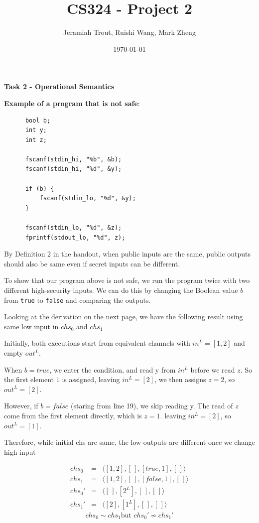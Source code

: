 \documentclass[11pt]{article}
\title{CS324 - Project 2}
\author{Jeramiah Trout, Ruishi Wang, Mark Zheng}
\date{\today}
\begin{document}
\maketitle
    
\noindent \textbf{Task 2 - Operational Semantics}

\textbf{Example of a program that is not safe}:
\begin{center}
    \begin{verbatim}
      bool b;
      int y;
      int z;
      
      fscanf(stdin_hi, "%b", &b);
      fscanf(stdin_hi, "%d", &y);
      
      if (b) {
          fscanf(stdin_lo, "%d", &y);   
      }
      
      fscanf(stdin_lo, "%d", &z);
      fprintf(stdout_lo, "%d", z);
    \end{verbatim}
\end{center}

\noindent By Definition 2 in the handout, when public inputs are the same, public outputs should also be same even if
secret inputs can be different. 

To show that our program above is not safe, we run the program twice with two different high-security inputs. We can
do this by changing the Boolean value $b$ from \texttt{true} to \texttt{false} and comparing the outputs. 

Looking at the derivation on the next page, we have the following result using same low input in $chs_0$ and $chs_1$

Initially, both executions start from equivalent channels with $in^L = [1,2]$ and empty $out^L$.  

When $b = true$, we enter the condition, and read y from $in^L$ before we read $z$.  
So the first element $1$ is assigned, leaving $in^L = [2]$, we then assigns $z = 2$, so $out^L = [2]$.  

However, if $b = false$ (staring from line 19), we skip reading y. The read of $z$ come from the first element directly, which is $z = 1$. leaving $in^L = [2]$, so $out^L = [1]$.  

Therefore, while initial chs are same, the low outputs are different once we change high input

\[
  \begin{array}{rcl}
  chs_0 &=& \langle [1,2], [\,], [true,1], [\,] \rangle \\[2mm]
  chs_1 &=& \langle [1,2], [\,], [false,1], [\,] \rangle \\[2mm]
  chs_0' &=& \langle [\,], [2^L], [\,], [\,] \rangle \\[2mm]
  chs_1' &=& \langle [2], [1^L], [\,], [\,] \rangle
  \end{array}
  \]
  \[
  chs_0 \sim chs_1 \text{but }
  chs_0' \not\sim chs_1'
  \]
\end{document}
